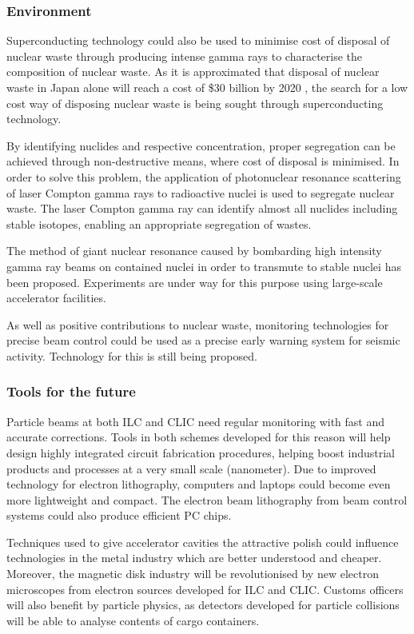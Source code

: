 \subsubsection{Environment}

Superconducting technology could also be used to minimise cost of disposal of nuclear waste through producing intense gamma rays to characterise the composition of nuclear waste. As it is approximated that disposal of nuclear waste in Japan alone will reach a cost of \$30 billion by 2020 \cite{Numo:DisposalCost}, the search for a low cost way of disposing nuclear waste is being sought through superconducting technology.

By identifying nuclides and respective concentration, proper segregation can be achieved through non-destructive means, where cost of disposal is minimised. In order to solve this problem, the application of photonuclear resonance scattering of laser Compton gamma rays to radioactive nuclei is used to segregate nuclear waste. The laser Compton gamma ray can identify almost all nuclides including stable isotopes, enabling an appropriate segregation of wastes.

The method of giant nuclear resonance caused by bombarding high intensity gamma ray beams on contained nuclei in order to transmute to stable nuclei has been proposed. Experiments are under way for this purpose using large-scale accelerator facilities.

As well as positive contributions to nuclear waste, monitoring technologies for precise beam control could be used as a precise early warning system for seismic activity. Technology for this is still being proposed. \cite{ILC:WhyNeed}

\subsubsection{Tools for the future}

Particle beams at both ILC and CLIC need regular monitoring with fast and accurate corrections. Tools in both schemes developed for this reason will help design highly integrated circuit fabrication procedures, helping boost industrial products and processes at a very small scale (nanometer). Due to improved technology for electron lithography, computers and laptops could become even more lightweight and compact. The electron beam lithography from beam control systems could also produce efficient PC chips.

Techniques used to give accelerator cavities the attractive polish could influence technologies in the metal industry which are better understood and cheaper. Moreover, the magnetic disk industry will be revolutionised by new electron microscopes from electron sources developed for ILC and CLIC. Customs officers will also benefit by particle physics, as detectors developed for particle collisions will be able to analyse contents of cargo containers. \cite{ILC:WhyNeed}

